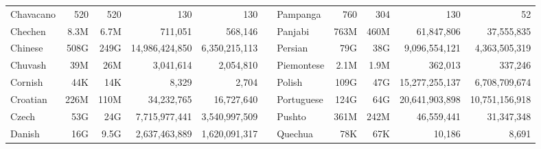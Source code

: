 \begin{table*}[t!]
{\begin{tabular}{@{}lrrrrclrrrr@{}}
            Chavacano                 & 520                      & 520                       & 130                      & 130                       &                          & Pampanga                  & 760                      & 304                       & 130                      & 52                        \\
            Chechen                   & 8.3M                     & 6.7M                      & 711,051                  & 568,146                   &                          & Panjabi                   & 763M                     & 460M                      & 61,847,806               & 37,555,835                \\
            Chinese                   & 508G                     & 249G                      & 14,986,424,850           & 6,350,215,113             &                          & Persian                   & 79G                      & 38G                       & 9,096,554,121            & 4,363,505,319             \\
            Chuvash                   & 39M                      & 26M                       & 3,041,614                & 2,054,810                 &                          & Piemontese                & 2.1M                     & 1.9M                      & 362,013                  & 337,246                   \\
            Cornish                   & 44K                      & 14K                       & 8,329                    & 2,704                     &                          & Polish                    & 109G                     & 47G                       & 15,277,255,137           & 6,708,709,674             \\
            Croatian                  & 226M                     & 110M                      & 34,232,765               & 16,727,640                &                          & Portuguese                & 124G                     & 64G                       & 20,641,903,898           & 10,751,156,918            \\
            Czech                     & 53G                      & 24G                       & 7,715,977,441            & 3,540,997,509             &                          & Pushto                    & 361M                     & 242M                      & 46,559,441               & 31,347,348                \\
            Danish                    & 16G                      & 9.5G                      & 2,637,463,889            & 1,620,091,317             &                          & Quechua                   & 78K                      & 67K                       & 10,186                   & 8,691                     \\

\end{tabular}}
\end{table*}
